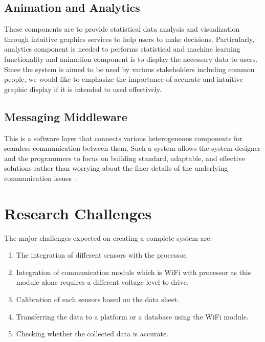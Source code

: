 \documentclass[11pt]{article}
\begin{document}
 \subsection{Animation and Analytics}
 
These components are to provide statistical data analysis and visualization through intuitive graphics services to help users to make decisions. Particularly, analytics component is needed to performs statistical and machine learning functionality and animation component is to display the necessary data to users. Since the system is aimed to be used by various stakeholders including common people, we would like to emphasize the importance of accurate and intuitive graphic display if it is intended to used effectively. 

 \subsection{Messaging Middleware}

 This is a software layer that connects various heterogeneous components for seamless communication between them. Such a system allows the system designer and the programmers to focus on building standard, adaptable, and effective solutions rather than worrying about the finer details of the underlying communication issues \cite{N15}.
 

\section{Research Challenges}


The major challenges expected on creating a complete system are:

\begin{enumerate}


\item The integration of different sensors with the processor.

\item Integration of communication module which is  WiFi with processor as this module alone requires a different voltage level to drive.

\item Calibration of each sensors based on the data sheet.

\item Transferring the data to a platform or a database using the WiFi module.

\item Checking whether the collected data is accurate.


\end{enumerate}
\end{document}
